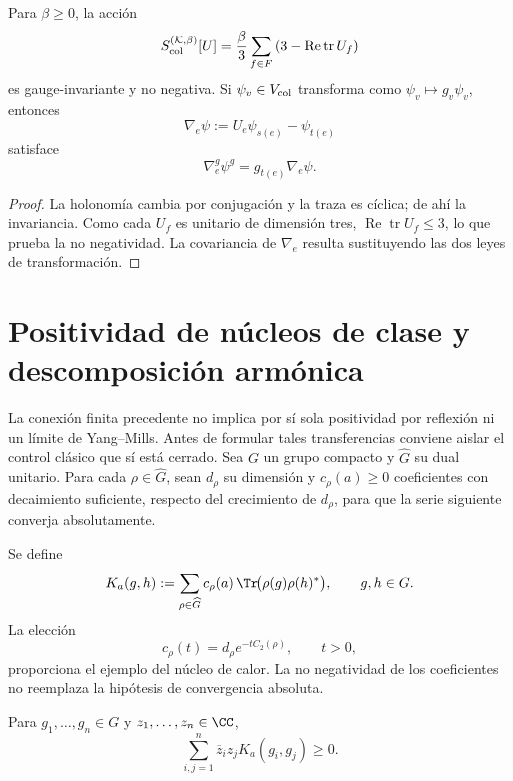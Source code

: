 \begin{proposition}
\label{prop:wilson-color-finito}
Para \(\beta\ge0\), la acción
\[
 S_{\rm col}^{(\mathcal K,\beta)}[U]
 =\frac{\beta}{3}\sum_{f\in F}
 \left(3-\operatorname{Re}\operatorname{tr}U_f\right)
\]
es gauge-invariante y no negativa. Si
\(\psi_v\in V_{\rm col}\) transforma como
\(\psi_v\mapsto g_v\psi_v\), entonces
\[
 \nabla_e\psi:=U_e\psi_{s(e)}-\psi_{t(e)}
\]
satisface
\[
 \nabla_e^g\psi^g=g_{t(e)}\nabla_e\psi.
\]
\end{proposition}

\begin{proof}
La holonomía cambia por conjugación y la traza es cíclica; de ahí la
invariancia. Como cada \(U_f\) es unitario de dimensión tres,
\(\operatorname{Re}\operatorname{tr}U_f\le3\), lo que prueba la no
negatividad. La covariancia de \(\nabla_e\) resulta sustituyendo las dos leyes
de transformación.
\end{proof}

\section{Positividad de núcleos de clase y descomposición armónica}

La conexión finita precedente no implica por sí sola positividad por
reflexión ni un límite de Yang--Mills. Antes de formular tales transferencias
conviene aislar el control clásico que sí está cerrado. Sea \(G\) un grupo
compacto y \(\widehat G\) su dual unitario. Para cada
\(\rho\in\widehat G\), sean \(d_\rho\) su dimensión y
\(c_\rho(a)\ge0\) coeficientes con decaimiento suficiente, respecto del
crecimiento de \(d_\rho\), para que la serie siguiente converja
absolutamente.

\begin{definition}
\label{pf84:YM-07}
Se define
\[
 K_a(g,h):=
 \sum_{\rho\in\widehat G}
 c_\rho(a)\,
 \Tr\!\bigl(\rho(g)\rho(h)^*\bigr),
 \qquad g,h\in G.
\]
La elección
\[
 c_\rho(t)=d_\rho e^{-tC_2(\rho)},
 \qquad t>0,
\]
proporciona el ejemplo del núcleo de calor. La no negatividad de los
coeficientes no reemplaza la hipótesis de convergencia absoluta.
\end{definition}

\begin{theorem}
\label{pf84:YM-08}
Para \(g_1,\dots,g_n\in G\) y \(z_1,\dots,z_n\in\CC\),
\[
 \sum_{i,j=1}^n
 \overline z_i z_jK_a(g_i,g_j)\ge0.
\]
\end{theorem}

